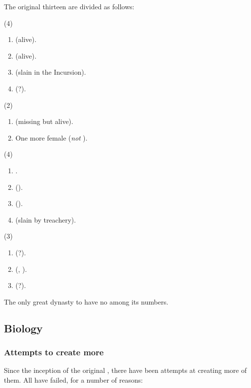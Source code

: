 The original thirteen are divided as follows: 
\begin{gloss}
  \gitem{\KiriathSepher} (4)
  \begin{enumerate}
    \item {} (alive). 
    \item {} (alive). 
    \item {} (slain in the Incursion). 
    \item {} (?). 
  \end{enumerate}
  \gitem{\Kezerad} (2)
  \begin{enumerate}
    \item {} (missing but alive). 
    \item One more female (\emph{not} \Aryal). 
  \end{enumerate}
  \gitem{\Mystraacht} (4)
  \begin{enumerate}
    \item {}.
    \item {} (\Malach). 
    \item {} (\Malach). 
    \item {} (slain by treachery). 
  \end{enumerate}
  \gitem{\TiphredSerah} (3)
  \begin{enumerate}
    \item {} (?). 
    \item {} (\Malach, ). 
    \item {} (?). 
  \end{enumerate}
  \gitem{\Baelzerach} 
    The only great dynasty to have no \satharioth{} among its numbers. 
\end{gloss}










\subsection{Biology}
\subsubsection{Attempts to create more \satharioth}
Since the inception of the original \satharioth, there have been attempts at creating more of them. 
All have failed, for a number of reasons:

